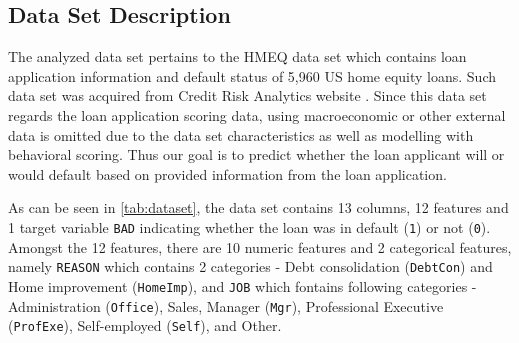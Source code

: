 \subsection{Data Set Description}
\label{subsec:datadescript}
The analyzed data set pertains to the HMEQ data set which contains loan application information and default status of 5,960 US home equity loans. Such data set was acquired from Credit Risk Analytics website \citep{baesens2016credit}. Since this data set regards the loan application scoring data, using macroeconomic or other external data is omitted due to the data set characteristics as well as modelling with behavioral scoring.
Thus our goal is to predict whether the loan applicant will or would default based on provided information from the loan application.

As can be seen in \autoref{tab:dataset}, the data set contains 13 columns, 12 features and 1 target variable \texttt{BAD} indicating whether the loan was in default (\texttt{1}) or not (\texttt{0}). 
Amongst the 12 features, there are 10 numeric features and 2 categorical features, namely \texttt{REASON} which contains 2 categories - Debt consolidation (\texttt{DebtCon}) and Home improvement (\texttt{HomeImp}), and \texttt{JOB} which fontains following categories - Administration (\texttt{Office}), Sales, Manager (\texttt{Mgr}), Professional Executive (\texttt{ProfExe}), Self-employed (\texttt{Self}), and Other.


